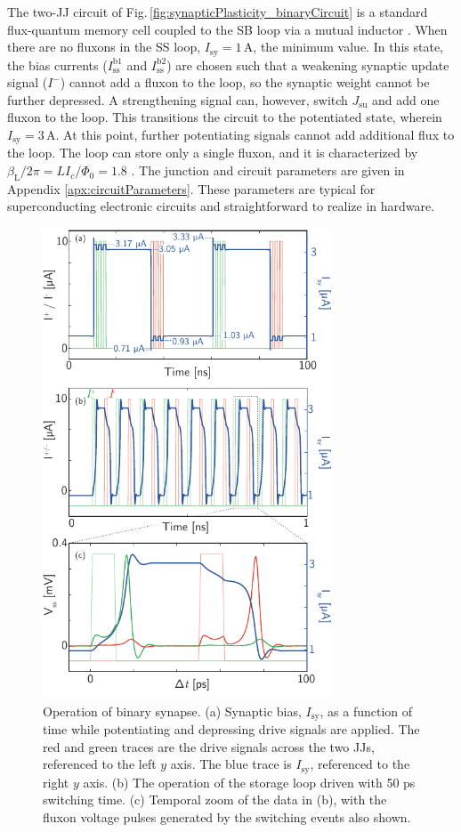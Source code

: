 \documentclass[twocolumn]{article}
\begin{document}
The two-JJ circuit of Fig.\,\ref{fig:synapticPlasticity_binaryCircuit} is a standard flux-quantum memory cell \cite{ka1999,vatu1998} coupled to the SB loop via a mutual inductor \cite{miha2005}. When there are no fluxons in the SS loop, $I_{\mathrm{sy}} = 1$\,\textmu A, the minimum value. In this state, the bias currents ($I^{\mathrm{b1}}_{\mathrm{ss}}$ and $I^{\mathrm{b2}}_{\mathrm{ss}}$) are chosen such that a weakening synaptic update signal ($I^-$) cannot add a fluxon to the loop, so the synaptic weight cannot be further depressed. A strengthening signal can, however, switch $J_{\mathrm{su}}$ and add one fluxon to the loop. This transitions the circuit to the potentiated state, wherein $I_{\mathrm{sy}} = 3$\,\textmu A. At this point, further potentiating signals cannot add additional flux to the loop. The loop can store only a single fluxon, and it is characterized by $\beta_{\mathrm{L}}/2\pi = L I_c/\Phi_0 = 1.8$ \cite{ka1999,vatu1998}. The junction and circuit parameters are given in Appendix \ref{apx:circuitParameters}. These parameters are typical for superconducting electronic circuits and straightforward to realize in hardware.
\begin{figure}[t!]
	\centerline{\includegraphics[width=8.6cm]{_synapticPlasticity_binary_small.pdf}}
	\caption{\label{fig:synapticPlasticity_binary}Operation of binary synapse. (a) Synaptic bias, $I_{\mathrm{sy}}$, as a function of time while potentiating and depressing drive signals are applied. The red and green traces are the drive signals across the two JJs, referenced to the left $y$ axis. The blue trace is $I_{\mathrm{sy}}$, referenced to the right $y$ axis. (b) The operation of the storage loop driven with 50 ps switching time. (c) Temporal zoom of the data in (b), with the fluxon voltage pulses generated by the switching events also shown.}
\end{figure}
\end{document}

